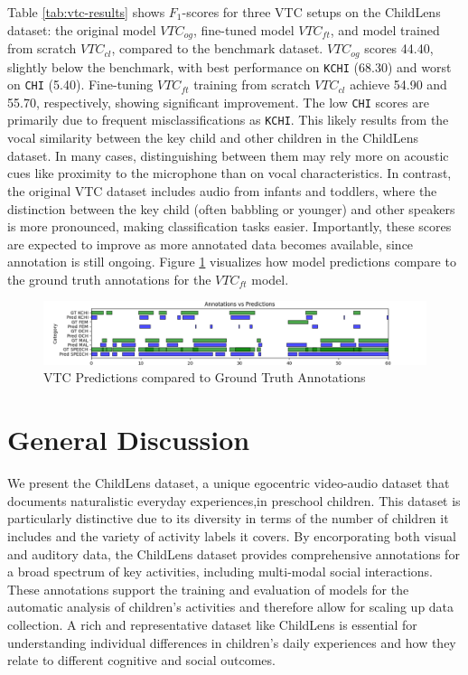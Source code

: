\documentclass[
  man,floatsintext]{apa6}
\begin{document}
Table \ref{tab:vtc-results} shows \(F_1\)-scores for three VTC setups on the ChildLens dataset: the original model \(VTC_{og}\), fine-tuned model \(VTC_{ft}\), and model trained from scratch \(VTC_{cl}\), compared to the benchmark dataset. \(VTC_{og}\) scores 44.40, slightly below the benchmark, with best performance on \texttt{KCHI} (68.30) and worst on \texttt{CHI} (5.40). Fine-tuning \(VTC_{ft}\) training from scratch \(VTC_{cl}\) achieve 54.90 and 55.70, respectively, showing significant improvement. The low \texttt{CHI} scores are primarily due to frequent misclassifications as \texttt{KCHI}. This likely results from the vocal similarity between the key child and other children in the ChildLens dataset. In many cases, distinguishing between them may rely more on acoustic cues like proximity to the microphone than on vocal characteristics. In contrast, the original VTC dataset includes audio from infants and toddlers, where the distinction between the key child (often babbling or younger) and other speakers is more pronounced, making classification tasks easier. Importantly, these scores are expected to improve as more annotated data becomes available, since annotation is still ongoing. Figure \ref{fig:vtc-evaluations} visualizes how model predictions compare to the ground truth annotations for the \(VTC_{ft}\) model.

\begin{figure}

{\centering \includegraphics[width=6.67in]{images/vtc_performance_evaluation} 

}

\caption{VTC Predictions compared to Ground Truth Annotations}\label{fig:vtc-evaluations}
\end{figure}

\section{General Discussion}\label{general-discussion}

We present the ChildLens dataset, a unique egocentric video-audio dataset that documents naturalistic everyday experiences,in preschool children. This dataset is particularly distinctive due to its diversity in terms of the number of children it includes and the variety of activity labels it covers. By encorporating both visual and auditory data, the ChildLens dataset provides comprehensive annotations for a broad spectrum of key activities, including multi-modal social interactions. These annotations support the training and evaluation of models for the automatic analysis of children's activities and therefore allow for scaling up data collection. A rich and representative dataset like ChildLens is essential for understanding individual differences in children's daily experiences and how they relate to different cognitive and social outcomes.
\end{document}
